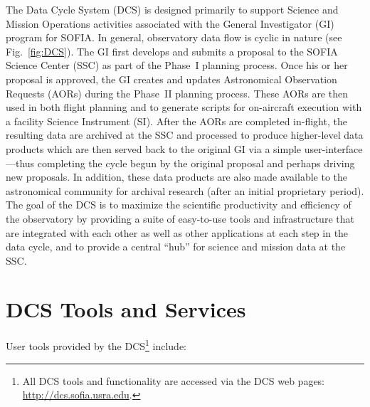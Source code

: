 \documentclass[11pt,twoside]{article}
\begin{document}
The Data Cycle System (DCS) is designed primarily to support Science and Mission Operations activities associated with the General Investigator (GI) program for SOFIA. In general, observatory data flow is cyclic in nature (see Fig.~\ref{fig:DCS}).  The GI first develops and submits a proposal to the SOFIA Science Center (SSC) as part of the Phase~I planning process. Once his or her proposal is approved, the GI creates and updates Astronomical Observation Requests (AORs) during the Phase~II planning process. These AORs are then used in both flight planning and to generate scripts for on-aircraft execution with a facility Science Instrument (SI). After the AORs are completed in-flight, the resulting data are archived at the SSC and processed to produce higher-level data products which are then served back to the original GI via a simple user-interface---thus completing the cycle begun by the original proposal and perhaps driving new proposals. In addition, these data products are also made available to the astronomical community for archival research (after an initial proprietary period).  The goal of the DCS is to maximize the scientific productivity and efficiency of the observatory by providing a suite of easy-to-use tools and infrastructure that are integrated with each other as well as other applications at each step in the data cycle, and to provide a central ``hub'' for science and mission data at the SSC.



\section{DCS Tools and Services}


User tools provided by the DCS\footnote{All DCS tools and functionality are accessed via the DCS web pages:  \url{http://dcs.sofia.usra.edu}. } 
include:
\end{document}
